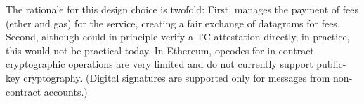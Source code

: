 The rationale for this design choice is twofold: First, \tcont manages the payment of fees (ether and gas) for the \tc service, creating a fair exchange of datagrams for fees. Second, although \reqcont could in principle verify a TC attestation directly, in practice, this would not be practical today. In Ethereum, opcodes for in-contract cryptographic operations are very limited and do not currently support public-key cryptography. (Digital signatures are supported only for messages from non-contract accounts.) 










